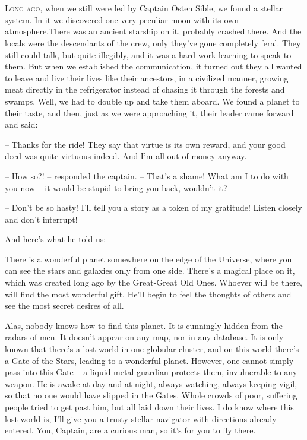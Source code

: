 \documentclass[ebook,oneside,final,openright]{memoir}
\begin{document}
\chapter{}
\par
\lettrine{L}{ong ago,} when we still were led by Captain Osten Sible, we found a stellar system. In it we discovered one very peculiar moon with its own atmosphere.There was an ancient starship on it, probably crashed there. And the locals were the descendants of the crew, only they’ve gone completely feral. They still could talk, but quite illegibly, and it was a hard work learning to speak to them. But when we established the communication, it turned out they all wanted to leave and live their lives like their ancestors, in a civilized manner, growing meat directly in the refrigerator instead of chasing it through the forests and swamps. Well, we had to double up and take them aboard. We found a planet to their taste, and then, just as we were approaching it, their leader came forward and said: \par
\par
– Thanks for the ride! They say that virtue is its own reward, and your good deed was quite virtuous indeed. And I’m all out of money anyway.\par
– How so?! – responded the captain. – That’s a shame! What am I to do with you now – it would be stupid to bring you back, wouldn’t it? \par
– Don’t be so hasty! I’ll tell you a story as a token of my gratitude! Listen closely and don’t interrupt! \par
 And here’s what he told us:\par
\par
 There is a wonderful planet somewhere on the edge of the Universe, where you can see the stars and galaxies only from one side. There’s a magical place on it, which was created long ago by the Great-Great Old Ones. Whoever will be there, will find the most wonderful gift. He’ll begin to feel the thoughts of others and see the most secret desires of all. \par
Alas, nobody knows how to find this planet. It is cunningly hidden from the radars of men. It doesn’t appear on any map, nor in any database. It is only known that there’s a lost world in one globular cluster, and on this world there’s a Gate of the Stars, leading to a wonderful planet. However, one cannot simply pass into this Gate – a liquid-metal guardian protects them, invulnerable to any weapon. He is awake at day and at night, always watching, always keeping vigil, so that no one would have slipped in the Gates. Whole crowds of poor, suffering people tried to get past him, but all laid down their lives. I do know where this lost world is, I’ll give you a trusty stellar navigator with directions already entered. You, Captain, are a curious man, so it’s for you to fly there.\par
\end{document}
